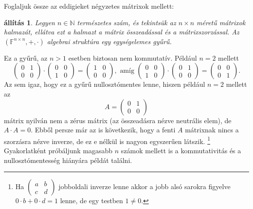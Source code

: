 \documentclass[9pt, a4paper, showtrims]{memoir}
\theoremstyle{plain}
\newtheorem{proposition}{állítás}[chapter]
\theoremstyle{remark}
\theoremstyle{definition}
\begin{document}
Foglaljuk össze az eddigieket négyzetes mátrixok mellett:
\begin{proposition}
	Legyen $n\in\mathbb{N}$ természetes szám, és tekintsük az $n\times n$ méretű mátrixok
	halmazát, ellátva ezt a halmazt a mátrix összeadással és a mátrixszorzással.
	Az $\left( \mathbb{F}^{n\times n},+,\cdot \right)$ algebrai struktúra egy egységelemes gyűrű.
\end{proposition}
Ez a gyűrű, az $n>1$ esetben biztosan nem kommutatív.
Például $n=2$ mellett
\[
	\begin{pmatrix}
		0 & 1 \\
		0 & 0
	\end{pmatrix}
	\cdot
	\begin{pmatrix}
		0 & 0 \\
		1 & 0
	\end{pmatrix}
	=
	\begin{pmatrix}
		1 & 0 \\
		0 & 0
	\end{pmatrix},
	\text{ amíg }
	\begin{pmatrix}
		0 & 0 \\
		1 & 0
	\end{pmatrix}
	\cdot
	\begin{pmatrix}
		0 & 1 \\
		0 & 0
	\end{pmatrix}
	=
	\begin{pmatrix}
		0 & 0 \\
		0 & 1
	\end{pmatrix}.
\]
Az sem igaz, hogy ez a gyűrű nullosztómentes lenne, hiszen például $n=2$ mellett az
\[
	A
	=
	\begin{pmatrix}
		0 & 1 \\
		0 & 0
	\end{pmatrix}
\]
mátrix nyilván nem a zérus mátrix (az összeadásra nézve neutrális elem),
de $A\cdot A=0$.
Ebből persze már az is következik, hogy a fenti $A$ mátrixnak nincs a szorzásra nézve inverze,
de ez e nélkül is nagyon egyszerűen látszik.%
\footnote{
	Ha
	\(
	\begin{pmatrix}
		a & b \\
		c & d
	\end{pmatrix}
	\)
	jobboldali inverze lenne akkor a jobb alsó sarokra figyelve $0\cdot b +0\cdot d=1$ lenne, de egy testben $1\neq 0$.
}
Gyakorlatként próbáljunk magasabb $n$ számok mellett is a kommutativitás és a nullosztómentesség hiányára
példát találni.
\end{document}
